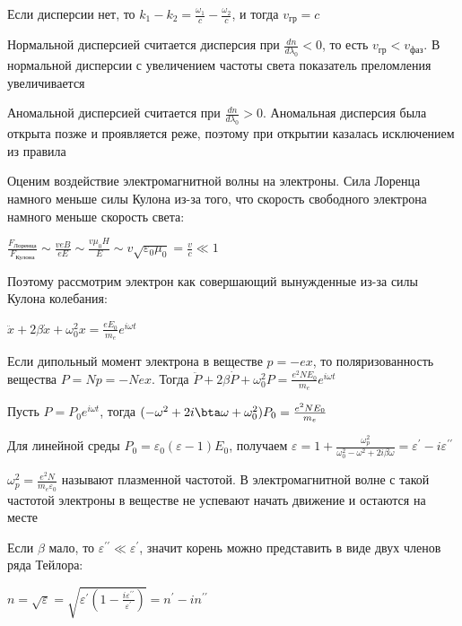 \documentclass[12pt]{article}
\begin{document}
Если дисперсии нет, то $k_1 - k_2 = \frac{\omega_1}{c} - \frac{\omega_2}{c}$, и тогда $v_{\text{гр}} = c$








Нормальной дисперсией считается дисперсия при $\frac{dn}{d\lambda_0} < 0$, то есть $v_{\text{гр}} < v_{\text{фаз}}$. В нормальной дисперсии с увеличением частоты света показатель преломления увеличивается

Аномальной дисперсией считается при $\frac{dn}{d\lambda_0} > 0$. Аномальная дисперсия была открыта позже и проявляется реже, поэтому при открытии казалась исключением из правила

\mediumvspace

Оценим воздействие электромагнитной волны на электроны. Сила Лоренца намного меньше силы Кулона из-за того, что скорость свободного электрона намного меньше скорость света:

$\frac{F_{\text{Лоренца}}}{F_{\text{Кулона}}} \sim \frac{v e B}{e E} \sim \frac{v \mu_0 H}{E} \sim v \sqrt{\varepsilon_0 \mu_0} = \frac{v}{c} \ll 1$

Поэтому рассмотрим электрон как совершающий вынужденные из-за силы Кулона колебания:

$\ddot x + 2 \beta \dot x + \omega_0^2 x = \frac{e E_0}{m_e} e^{i \omega t}$

Если дипольный момент электрона в веществе $p = -ex$, то поляризованность вещества $P = Np = -Nex$. Тогда $\ddot P + 2 \beta \dot P + \omega^2_0 P = \frac{e^2 N E_0}{m_e} e^{i \omega t}$

Пусть $P = P_0 e^{i \omega t}$, тогда $(-\omega^2 + 2 i \bta \omega + \omega_0^2) P_0 = \frac{e^2 N E_0}{m_e}$

Для линейной среды $P_0 = \varepsilon_0 (\varepsilon - 1) E_0$, получаем $\varepsilon = 1 + \frac{\omega_p^2}{\omega_0^2 - \omega^2 + 2i\beta \omega} = \varepsilon^{\prime} - i \varepsilon^{\prime\prime}$

$\omega_p^2 = \frac{e^2 N}{m_e \varepsilon_0}$ называют плазменной частотой. В электромагнитной волне с такой частотой электроны в веществе не успевают начать движение и остаются на месте

Если $\beta$ мало, то $\varepsilon^{\prime\prime} \ll \varepsilon^{\prime}$, значит корень можно представить в виде двух членов ряда Тейлора:

$n = \sqrt{\varepsilon} = \sqrt{\varepsilon^{\prime} \left(1 - \frac{i \varepsilon^{\prime\prime}}{\varepsilon^{\prime}}\right)} = n^{\prime} - i n^{\prime\prime}$
\end{document}
